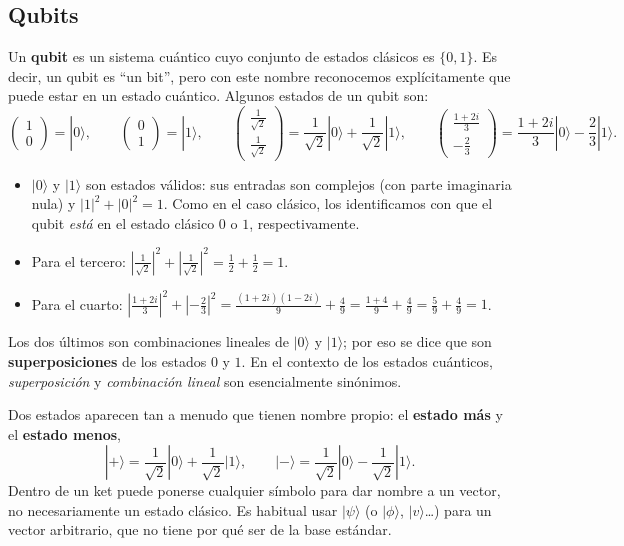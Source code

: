 \documentclass[11pt, a4paper, twoside, openright]{report}
\begin{document}
\subsection{Qubits}

\noindent Un \textbf{qubit} es un sistema cuántico cuyo conjunto de estados clásicos es $\{0,1\}$. Es decir, un qubit es ``un bit'', pero con este nombre reconocemos explícitamente que puede estar en un estado cuántico. Algunos estados de un qubit son:
\[
\begin{pmatrix} 1 \\ 0 \end{pmatrix} = |0\rangle, \qquad
\begin{pmatrix} 0 \\ 1 \end{pmatrix} = |1\rangle, \qquad
\begin{pmatrix} \frac{1}{\sqrt 2} \\[1mm] \frac{1}{\sqrt 2} \end{pmatrix} = \frac{1}{\sqrt 2}|0\rangle + \frac{1}{\sqrt 2}|1\rangle, \qquad
\begin{pmatrix} \frac{1+2i}{3} \\[1mm] -\frac{2}{3} \end{pmatrix} = \frac{1+2i}{3}|0\rangle - \frac{2}{3}|1\rangle.
\]
\begin{itemize}
    \item $|0\rangle$ y $|1\rangle$ son estados válidos: sus entradas son complejos (con parte imaginaria nula) y $|1|^2 + |0|^2 = 1$. Como en el caso clásico, los identificamos con que el qubit \textit{está} en el estado clásico $0$ o $1$, respectivamente.
    \item Para el tercero: $\left|\frac{1}{\sqrt 2}\right|^2 + \left|\frac{1}{\sqrt 2}\right|^2 = \frac12 + \frac12 = 1$.
    \item Para el cuarto: $\left|\frac{1+2i}{3}\right|^2 + \left|-\frac{2}{3}\right|^2 = \frac{(1+2i)(1-2i)}{9} + \frac49 = \frac{1+4}{9} + \frac49 = \frac59 + \frac49 = 1$.
\end{itemize}

\noindent Los dos últimos son combinaciones lineales de $|0\rangle$ y $|1\rangle$; por eso se dice que son \textbf{superposiciones} de los estados $0$ y $1$. En el contexto de los estados cuánticos, \textit{superposición} y \textit{combinación lineal} son esencialmente sinónimos.

\noindent Dos estados aparecen tan a menudo que tienen nombre propio: el \textbf{estado más} y el \textbf{estado menos},
\[ |+\rangle = \frac{1}{\sqrt 2}|0\rangle + \frac{1}{\sqrt 2}|1\rangle, \qquad |-\rangle = \frac{1}{\sqrt 2}|0\rangle - \frac{1}{\sqrt 2}|1\rangle. \]
Dentro de un ket puede ponerse cualquier símbolo para dar nombre a un vector, no necesariamente un estado clásico. Es habitual usar $|\psi\rangle$ (o $|\phi\rangle$, $|v\rangle$\dots) para un vector arbitrario, que no tiene por qué ser de la base estándar.
\end{document}
